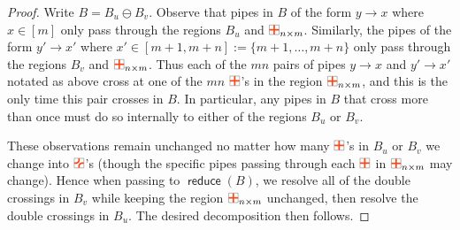 \documentclass[11pt]{article}
\theoremstyle{definition}
\numberwithin{equation}{section}
\DeclareMathOperator{\reduce}{\mathsf{reduce}}
\newcommand{\pipecolor}{UForange}
\newcommand{\tilescale}{0.27}
\newcommand{\drawSquare}{
    \draw[
        xshift=0.5cm,yshift=0.5cm,
        black,opacity=0.5,thin
    ] (0,0) rectangle (1,1);
}
\newcommand{\drawHorizontal}[2]{
    \draw[color=\pipecolor,very thick]
    (#1-0.5,#2) to (#1+0.5,#2);
}
\newcommand{\drawVertical}[2]{
    \draw[color=\pipecolor,very thick]
    (#1,#2-0.5) to (#1,#2+0.5);
}
\newcommand{\drawCross}[2]{
    \drawHorizontal{#1}{#2}
    \drawVertical{#1}{#2}
}
\newcommand{\drawRelbow}[2]{
    \draw[color=\pipecolor,very thick]
    (#1,#2-0.5) to (#1,#2-0.25) to[bend left] (#1+0.25,#2) to (#1+0.5,#2);
}
\newcommand{\drawJelbow}[2]{
    \draw[color=\pipecolor,very thick]
    (#1,#2+0.5) to (#1,#2+0.25) to[bend left] (#1-0.25,#2) to (#1-0.5,#2);
}
\newcommand{\drawBump}[2]{
    \drawRelbow{#1}{#2}
    \drawJelbow{#1}{#2}
}
\newcommand{\cross}[1][scale=\tilescale,baseline=4pt]{
    \begin{tikzpicture}[#1]
    \drawSquare
    \drawCross11
    \end{tikzpicture}
}
\newcommand{\bump}[1][scale=\tilescale,baseline=4pt]{
    \begin{tikzpicture}[#1]
    \drawSquare
    \drawBump11
    \end{tikzpicture}
}
\begin{document}
\begin{proof}
    Write $B = B_u\ominus B_v$.
    Observe that pipes in $B$ of the form $y\to x$ where $x\in [m]$ only pass through the regions $B_u$ and $\cross_{n\times m}$.
    Similarly, the pipes of the form $y'\to x'$ where $x'\in [m+1,m+n] := \{m+1,\dots,m+n\}$ only pass through the regions $B_v$ and $\cross_{n\times m}$.
    Thus each of the $mn$ pairs of pipes $y\to x$ and $y'\to x'$ notated as above cross at one of the $mn$ $\cross$'s in the region $\cross_{n\times m}$, and this is the only time this pair crosses in $B$.
    In particular, any pipes in $B$ that cross more than once must do so internally to either of the regions $B_u$ or $B_v$.
    
    These observations remain unchanged no matter how many $\cross$'s in $B_u$ or $B_v$ we change into $\bump$'s (though the specific pipes passing through each $\cross$ in $\cross_{n\times m}$ may change).
    Hence when passing to $\reduce(B)$, we resolve all of the double crossings in $B_v$ while keeping the region $\cross_{n\times m}$ unchanged, then resolve the double crossings in $B_u$.
    The desired decomposition then follows.
\end{proof}
\end{document}

